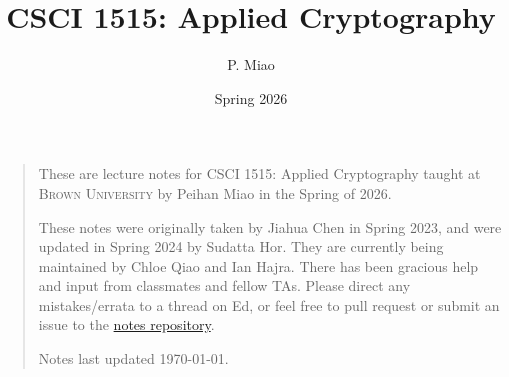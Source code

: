 \documentclass[letterpaper, 11pt, colorful, sections]{cs1515}
\title{CSCI 1515: Applied Cryptography}
\author{P. Miao}
\date{Spring 2026}
\numberwithin{equation}{section}
\begin{document}
\maketitle
\begin{quote}
    \quad These are lecture notes for CSCI 1515: Applied Cryptography taught at \textsc{Brown University} by Peihan Miao in the Spring of 2026.

    \quad These notes were originally taken by Jiahua Chen in Spring 2023, and were updated in Spring 2024 by Sudatta Hor. They are currently being maintained by Chloe Qiao and Ian Hajra. There has been gracious help and input from classmates and fellow TAs. Please direct any mistakes/errata to a thread on Ed, or feel free to pull request or submit an issue to the \href{https://github.com/BrownAppliedCryptography/notes}{notes repository}.

    \quad Notes last updated \today.
\end{quote}

\tableofcontents
% 
% 

\newpage
























\end{document}
